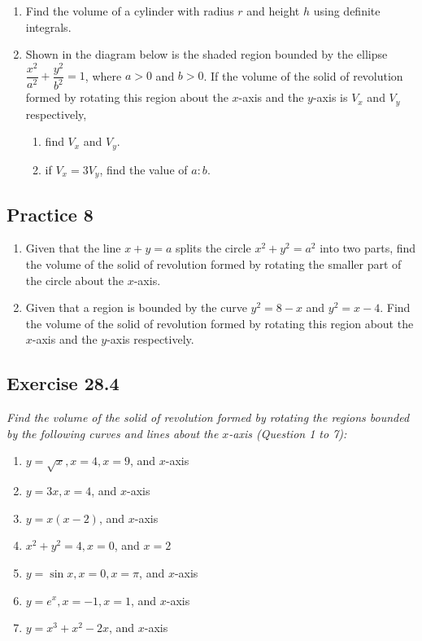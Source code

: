 \documentclass{report}
\begin{document}
\begin{enumerate}
    \item Find the volume of a cylinder with radius $r$ and height $h$ using definite
          integrals.
    \item Shown in the diagram below is the shaded region bounded by the ellipse
          $\dfrac{x^2}{a^2} + \dfrac{y^2}{b^2} = 1$, where $a > 0$ and $b > 0$. If the
          volume of the solid of revolution formed by rotating this region about the
          $x$-axis and the $y$-axis is $V_x$ and $V_y$ respectively,
          \begin{enumerate}
              \item find $V_x$ and $V_y$.
              \item if $V_x = 3V_y$, find the value of $a:b$.
          \end{enumerate}
\end{enumerate}

\subsection{Practice 8}

\begin{enumerate}
    \item Given that the line $x + y = a$ splits the circle $x^2 + y^2 = a^2$ into two
          parts, find the volume of the solid of revolution formed by rotating the
          smaller part of the circle about the $x$-axis.
    \item Given that a region is bounded by the curve $y^2 = 8 - x$ and $y^2 = x - 4$.
          Find the volume of the solid of revolution formed by rotating this region about
          the $x$-axis and the $y$-axis respectively.
\end{enumerate}

\subsection{Exercise 28.4}

\noindent \hspace{1.2em}\textit{Find the volume of the solid of revolution formed by rotating the regions bounded by the following curves and lines about the $x$-axis (Question 1 to 7):}

\begin{enumerate}
    \item $y=\sqrt{x}, x=4, x=9$, and $x$-axis
    \item $y=3 x, x=4$, and $x$-axis
    \item $y=x(x-2)$, and $x$-axis
    \item $x^2+y^2=4, x=0$, and $x=2$
    \item $y=\sin x, x=0, x=\pi$, and $x$-axis
    \item $y=e^x, x=-1, x=1$, and $x$-axis
    \item $y=x^3+x^2-2 x$, and $x$-axis
\end{enumerate}
\end{document}
